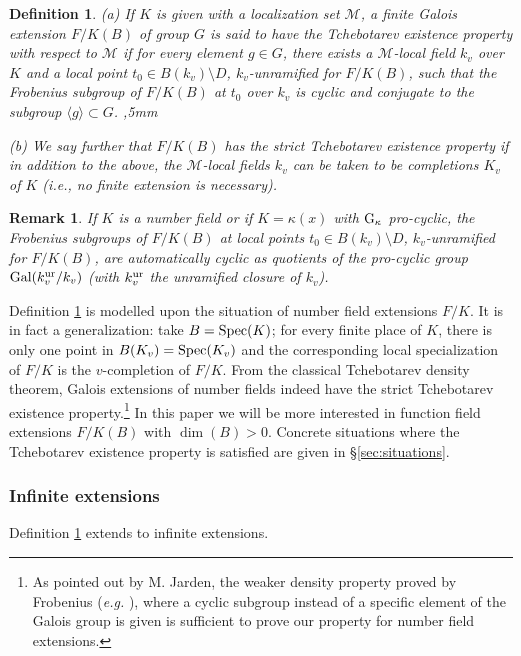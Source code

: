 \documentclass[12pt,english]{amsart}
\newtheorem{twisting lemma}[theorem]{Twisting lemma}
\newtheorem{definition}[theorem]{Definition}
\newtheorem{remark}[theorem]{Remark}
\begin{document}
\begin{definition} \label{def:tchebotarev}
(a) If $K$ is given with a localization set ${\mathcal M}$, a finite Galois extension $F/K(B)$ of group $G$ is said to have the {\it Tchebotarev existence property with respect to ${\mathcal M}$} if for every element $g\in G$, there exists a ${\mathcal M}$-local field $k_v$ over $K$ and a local point $t_0\in B(k_v)\setminus D$,  $k_v$-unramified  for $F/K(B)$, such that the Frobenius subgroup of $F/K(B)$ at $t_0$ over $k_v$ is cyclic and conjugate to the subgroup $\langle g\rangle\subset G$. 
,5mm

\noindent
(b) We say further that $F/K(B)$ has the {\it strict  Tchebotarev existence property} if in addition to the above, the ${\mathcal M}$-local fields $k_v$ can be taken to be completions $K_v$ of $K$ ({\it i.e.}, no finite extension is necessary). 
\end{definition}

\begin{remark}\label{rem:unr-loc-deg-bounded} If $K$ is a number field or if $K=\kappa(x)$ with ${\hbox{\rm G}}_\kappa$ pro-cyclic, the Frobenius subgroups of $F/K(B)$ at local points $t_0\in B(k_v)\setminus D$, $k_v$-unramified for $F/K(B)$, are automatically cyclic as quotients of the pro-cyclic group ${\hbox{\rm Gal}}(k_v^{{\scriptsize\hbox{\rm ur}}}/k_v)$ (with $k_v^{{\scriptsize\hbox{\rm ur}}}$ the unramified closure of $k_v$). 
\end{remark}

Definition \ref{def:tchebotarev} is modelled upon the situation of number field extensions 
$F/K$. It is in fact a generalization: take $B={\rm Spec}(K)$; for every finite place of $K$, there is 
only one point in $B(K_v)={\rm Spec}(K_v)$ and the corresponding local specialization of $F/K$ is the $v$-completion of $F/K$. From the classical Tchebotarev density theorem, Galois extensions of number fields indeed have the strict Tchebotarev existence
property.\footnote{As pointed out by M. Jarden, the weaker density property proved by Frobenius 
({\it e.g.} \cite[p.134]{janusz}), where a cyclic subgroup instead of a specific element of the Galois group
is given is sufficient to prove our property for number field extensions.}
In this paper we will be more interested in function field extensions $F/K(B)$ with $\dim(B)>0$. 
Concrete situations where the {Tchebotarev existence property} is satisfied are given in \S \ref{sec:situations}.

\subsubsection{Infinite extensions} \label{ssec:tchebotarev-infinite} 
Definition \ref{def:tchebotarev} extends to infinite extensions. 
\end{document}

